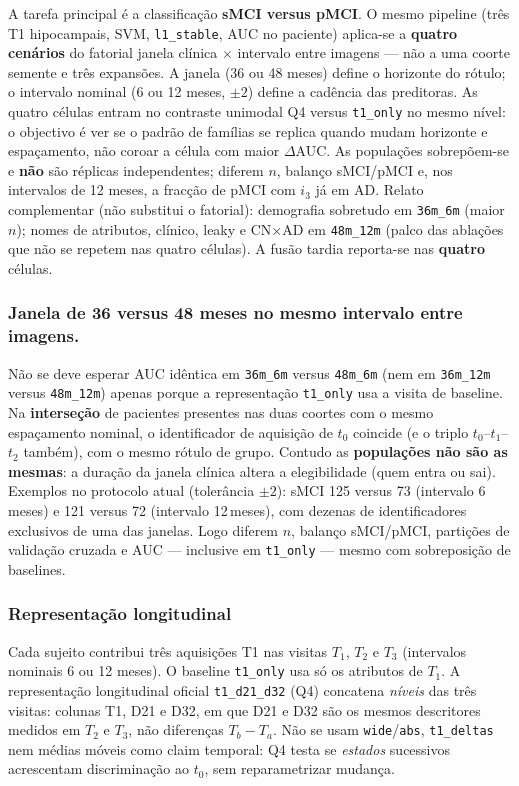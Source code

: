 \documentclass[review]{elsarticle}
\newcommand{\code}[1]{\texttt{#1}}
\begin{document}
		A tarefa principal é a classificação \textbf{sMCI versus pMCI}.
		O mesmo pipeline (três T1 hipocampais, SVM, \code{l1\_stable}, AUC no paciente) aplica-se a \textbf{quatro cenários} do fatorial janela clínica $\times$ intervalo entre imagens --- não a uma coorte semente e três expansões.
		A janela (36 ou 48 meses) define o horizonte do rótulo; o intervalo nominal (6 ou 12 meses, $\pm 2$) define a cadência das preditoras.
		As quatro células entram no contraste unimodal Q4 versus \code{t1\_only} no mesmo nível: o objectivo é ver se o padrão de famílias se replica quando mudam horizonte e espaçamento, não coroar a célula com maior $\Delta$AUC.
		As populações sobrepõem-se e \textbf{não} são réplicas independentes; diferem $n$, balanço sMCI/pMCI e, nos intervalos de 12 meses, a fracção de pMCI com $i_3$ já em AD.
		Relato complementar (não substitui o fatorial): demografia sobretudo em \code{36m\_6m} (maior $n$); nomes de atributos, clínico, leaky e CN$\times$AD em \code{48m\_12m} (palco das ablações que não se repetem nas quatro células).
		A fusão tardia reporta-se nas \textbf{quatro} células.

	\subsubsection{Janela de 36 versus 48 meses no mesmo intervalo entre imagens.}
		Não se deve esperar AUC idêntica em \code{36m\_6m} versus \code{48m\_6m} (nem em \code{36m\_12m} versus \code{48m\_12m}) apenas porque a representação \code{t1\_only} usa a visita de baseline.
		Na \textbf{interseção} de pacientes presentes nas duas coortes com o mesmo espaçamento nominal, o identificador de aquisição de $t_0$ coincide (e o triplo $t_0$--$t_1$--$t_2$ também), com o mesmo rótulo de grupo.
		Contudo as \textbf{populações não são as mesmas}: a duração da janela clínica altera a elegibilidade (quem entra ou sai).
		Exemplos no protocolo atual (tolerância $\pm 2$): sMCI 125 versus 73 (intervalo 6\,meses) e 121 versus 72 (intervalo 12\,meses), com dezenas de identificadores exclusivos de uma das janelas.
		Logo diferem $n$, balanço sMCI/pMCI, partições de validação cruzada e AUC --- inclusive em \code{t1\_only} --- mesmo com sobreposição de baselines.

	\subsubsection{Representação longitudinal}\label{subsec:q4}

		Cada sujeito contribui três aquisições T1 nas visitas $T_1$, $T_2$ e $T_3$ (intervalos nominais 6 ou 12 meses).
		O baseline \code{t1\_only} usa só os atributos de $T_1$.
		A representação longitudinal oficial \code{t1\_d21\_d32} (Q4) concatena \emph{níveis} das três visitas: colunas T1, D21 e D32, em que D21 e D32 são os mesmos descritores medidos em $T_2$ e $T_3$, não diferenças $T_b-T_a$.
		Não se usam \code{wide}/\code{abs}, \code{t1\_deltas} nem médias móveis como claim temporal: Q4 testa se \emph{estados} sucessivos acrescentam discriminação ao $t_0$, sem reparametrizar mudança.
\end{document}
